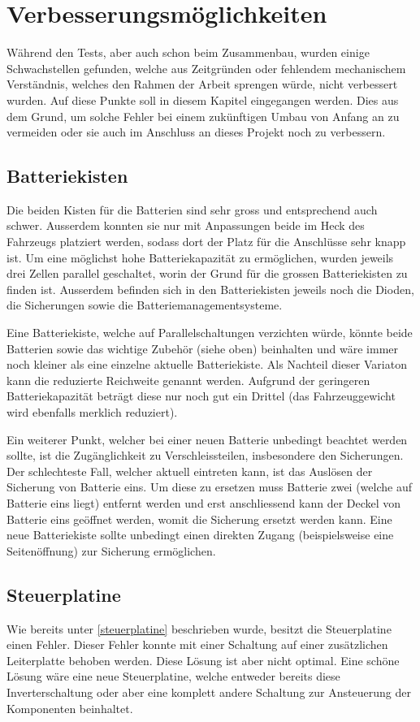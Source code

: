 \section{Verbesserungsmöglichkeiten}
\color{blue}
Während den Tests, aber auch schon beim Zusammenbau, wurden einige Schwachstellen gefunden, welche aus Zeitgründen oder fehlendem mechanischem Verständnis, welches den Rahmen der Arbeit sprengen würde, nicht verbessert wurden. Auf diese Punkte soll in diesem Kapitel eingegangen werden. Dies aus dem Grund, um solche Fehler bei einem zukünftigen Umbau von Anfang an zu vermeiden oder sie auch im Anschluss an dieses Projekt noch zu verbessern. 

\subsection{Batteriekisten}
Die beiden Kisten für die Batterien sind sehr gross und entsprechend auch schwer. Ausserdem konnten sie nur mit Anpassungen beide im Heck des Fahrzeugs platziert werden, sodass dort der Platz für die Anschlüsse sehr knapp ist. Um eine möglichst hohe Batteriekapazität zu ermöglichen, wurden jeweils drei Zellen parallel geschaltet, worin der Grund für die grossen Batteriekisten zu finden ist. Ausserdem befinden sich in den Batteriekisten jeweils noch die Dioden, die Sicherungen sowie die Batteriemanagementsysteme.

Eine Batteriekiste, welche auf Parallelschaltungen verzichten würde, könnte beide Batterien sowie das wichtige Zubehör (siehe oben) beinhalten und wäre immer noch kleiner als eine einzelne aktuelle Batteriekiste. Als Nachteil dieser Variaton kann die reduzierte Reichweite genannt werden. Aufgrund der geringeren Batteriekapazität beträgt diese nur noch gut ein Drittel (das Fahrzeuggewicht wird ebenfalls merklich reduziert).

Ein weiterer Punkt, welcher bei einer neuen Batterie unbedingt beachtet werden sollte, ist die Zugänglichkeit zu Verschleissteilen, insbesondere den Sicherungen. Der schlechteste Fall, welcher aktuell eintreten kann, ist das Auslösen der Sicherung von Batterie eins. Um diese zu ersetzen muss Batterie zwei (welche auf Batterie eins liegt) entfernt werden und erst anschliessend kann der Deckel von Batterie eins geöffnet werden, womit die Sicherung ersetzt werden kann. Eine neue Batteriekiste sollte unbedingt einen direkten Zugang (beispielsweise eine Seitenöffnung) zur Sicherung ermöglichen.

\subsection{Steuerplatine}
Wie bereits unter \ref{steuerplatine} beschrieben wurde, besitzt die Steuerplatine einen Fehler. Dieser Fehler konnte mit einer Schaltung auf einer zusätzlichen Leiterplatte behoben werden. Diese Lösung ist aber nicht optimal. Eine schöne Lösung wäre eine neue Steuerplatine, welche entweder bereits diese Inverterschaltung oder aber eine komplett andere Schaltung zur Ansteuerung der Komponenten beinhaltet.


